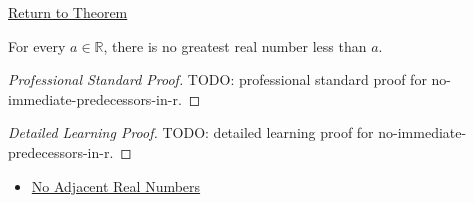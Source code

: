 \newpage
{}
\label{prf:no-immediate-predecessors-in-r}

\begin{remark*}[Return]
\hyperref[thm:no-immediate-predecessors-in-r]{Return to Theorem}
\end{remark*}

\begin{theorem*}
For every $a\in\mathbb{R}$, there is no greatest real number less than $a$.
\end{theorem*}

\begin{proof}[Professional Standard Proof]
\LRAProofBodyStart
TODO: professional standard proof for no-immediate-predecessors-in-r.
\end{proof}

\begin{proof}[Detailed Learning Proof]
\LRAProofBodyStart
TODO: detailed learning proof for no-immediate-predecessors-in-r.
\end{proof}

\begin{remark*}
\end{remark*}

\begin{dependencies}
\begin{itemize}
  \item \hyperref[cor:no-adjacent-real-numbers]{No Adjacent Real Numbers}
\end{itemize}
\end{dependencies}

\clearpage
